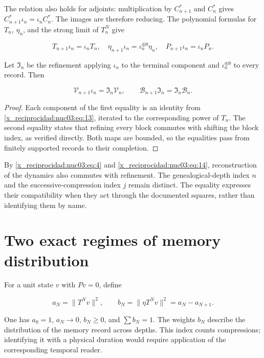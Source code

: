 The relation also holds for adjoints: multiplication by \(C_{n+1}^*\) and \(C_n^*\) gives \(C_{n+1}^*\iota_n=\iota_nC_n^*\). The images are therefore reducing. The polynomial formulas for \(T_n\), \(\eta_n\), and the strong limit of \(T_n^N\) give

\begin{equation}
T_{n+1}\iota_n=\iota_nT_n,\quad
\eta_{n+1}\iota_n=\iota_n^{\oplus9}\eta_n,\quad
P_{n+1}\iota_n=\iota_nP_n.
\label{x_reciprocidad:nuc03:eq:13}
\end{equation}

Let \(\mathfrak I_n\) be the refinement applying \(\iota_n\) to the terminal component and \(\iota_n^{\oplus9}\) to every record. Then

\begin{equation}
\boxed{\mathcal V_{n+1}\iota_n=\mathfrak I_n\mathcal V_n,\qquad
\mathcal B_{n+1}\mathfrak I_n=\mathfrak I_n\mathcal B_n.}
\label{x_reciprocidad:nuc03:eq:14}
\end{equation}

\begin{proof}
Each component of the first equality is an identity from \eqref{x_reciprocidad:nuc03:eq:13}, iterated to the corresponding power of \(T_n\). The second equality states that refining every block commutes with shifting the block index, as verified directly. Both maps are bounded, so the equalities pass from finitely supported records to their completion.
\end{proof}

By \eqref{x_reciprocidad:nuc03:eq:4} and \eqref{x_reciprocidad:nuc03:eq:14}, reconstruction of the dynamics also commutes with refinement. The genealogical-depth index \(n\) and the successive-compression index \(j\) remain distinct. The equality expresses their compatibility when they act through the documented squares, rather than identifying them by name.

\section{Two exact regimes of memory distribution}

For a unit state \(v\) with \(Pv=0\), define

\begin{equation}
a_N=\|T^Nv\|^2,\qquad b_N=\|\eta T^Nv\|^2=a_N-a_{N+1}.
\label{x_reciprocidad:nuc03:eq:15}
\end{equation}

One has \(a_0=1\), \(a_N\to0\), \(b_N\geq0\), and \(\sum b_N=1\). The weights \(b_N\) describe the distribution of the memory record across depths. This index counts compressions; identifying it with a physical duration would require application of the corresponding temporal reader.

